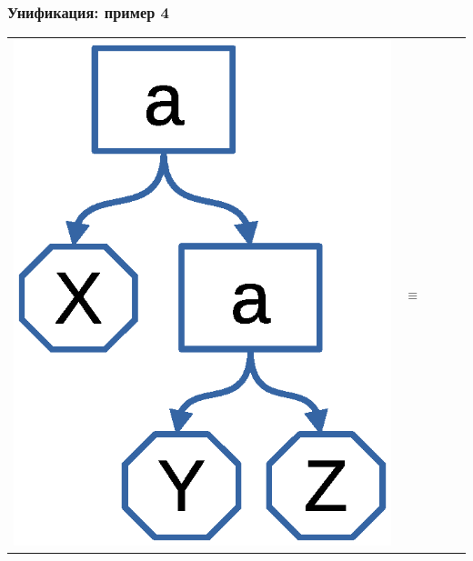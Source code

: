 \documentclass{../../slides-style}
\begin{document}
    \begin{frame}
        \frametitle{Унификация: пример 4}
    \begin{tabular}{m{25mm}cm{25mm}cm{25mm}}
    \includegraphics[scale=0.4]{term5.eps} &
    \textbf{\Huge $\equiv$} &

\end{tabular}
\end{frame}
\end{document}
